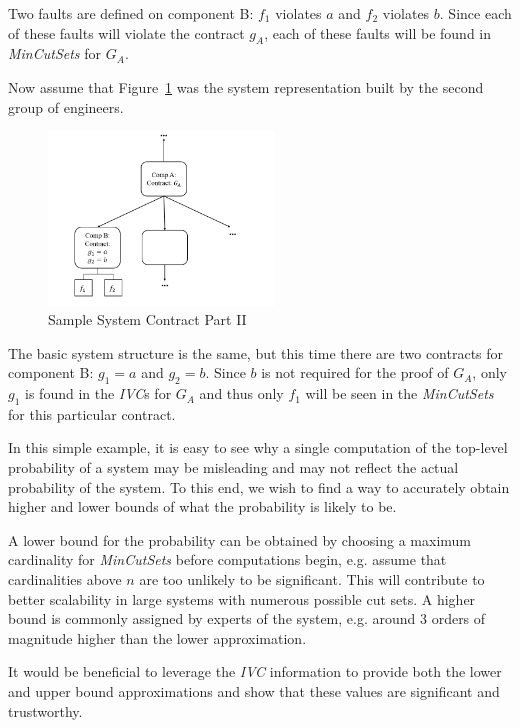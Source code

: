 Two faults are defined on component B: $f_1$ violates $a$ and $f_2$ violates $b$. Since each of these faults will violate the contract $g_A$, each of these faults will be found in \textit{MinCutSets} for $G_A$.

Now assume that Figure~\ref{fig:probComp2} was the system representation built by the second group of engineers. 
\begin{figure}[h]
\begin{center}
\includegraphics[width=6cm]{images/probComp2.PNG}
\caption{Sample System Contract Part II} \label{fig:probComp2}
\end{center}
\end{figure} 
The basic system structure is the same, but this time there are two contracts for component B: $g_1 = a$ and $g_2 = b$. Since $b$ is not required for the proof of $G_A$, only $g_1$ is found in the \textit{IVC}s for $G_A$ and thus only $f_1$ will be seen in the \textit{MinCutSets} for this particular contract. 

In this simple example, it is easy to see why a single computation of the top-level probability of a system may be misleading and may not reflect the actual probability of the system. To this end, we wish to find a way to accurately obtain higher and lower bounds of what the probability is likely to be. 

A lower bound for the probability can be obtained by choosing a maximum cardinality for \textit{MinCutSets} before computations begin, e.g. assume that cardinalities above $n$ are too unlikely to be significant. This will contribute to better scalability in large systems with numerous possible cut sets. A higher bound is commonly assigned by experts of the system, e.g. around 3 orders of magnitude higher than the lower approximation. 

It would be beneficial to leverage the \textit{IVC} information to provide both the lower and upper bound approximations and show that these values are significant and trustworthy. 



